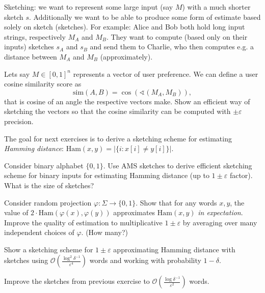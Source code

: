 \documentclass[12pt]{uebung}
\begin{document}
 


\renewcommand{\aufgname}{Exercise}

Sketching: we want to represent some large input (say $M$) with a much shorter sketch $s$. Additionally we want to be able to produce some form of estimate based solely on sketch (sketches). For example: Alice and Bob both hold long input strings, respectively $M_A$ and $M_B$. They want to compute (based only on their inputs) sketches $s_A$ and $s_B$ and send them to Charlie, who then computes e.g. a distance between $M_A$ and $M_B$ (approximately).

\begin{aufg}
Lets say $M \in [0,1]^n$ represents a vector of user preference. We can define a user cosine similarity score as
$$\textrm{sim}(A,B) = \cos( \sphericalangle(M_A,M_B)),$$
that is cosine of an angle the respective vectors make.
Show an efficient way of sketching the vectors so that the cosine similarity can be computed with $\pm \varepsilon$ precision.
\end{aufg}

\vfill

The goal for next exercises is to derive a sketching scheme for estimating \emph{Hamming distance}: $\textrm{Ham}(x,y) = | \{ i : x[i] \not= y[i] \} |$.

\begin{aufg}
Consider binary alphabet $\{0,1\}$. Use AMS sketches to derive efficient sketching scheme  for binary inputs for estimating Hamming distance (up to $1\pm\varepsilon$ factor). What is the size of sketches?
\end{aufg}

\begin{aufg}
Consider random projection $\varphi : \Sigma \to \{0,1\}$.  Show that for any words $x,y$, the value of $2 \cdot \textrm{Ham}(\varphi(x), \varphi(y))$ approximates $\textrm{Ham}(x,y)$ \emph{in expectation}. Improve the quality of estimation to multiplicative $1\pm \varepsilon$ by averaging over many independent choices of $\varphi$. (How many?)
\end{aufg}

\begin{aufg}
Show a sketching scheme for $1\pm \varepsilon$ approximating Hamming distance with sketches using $\mathcal{O}(\frac{\log^2 \delta^{-1}}{\varepsilon^4})$ words and working with probability $1-\delta$.
\end{aufg}

\begin{aufg}[2 pts]
Improve the sketches from previous exercise to $\mathcal{O}(\frac{\log \delta^{-1}}{\varepsilon^2})$ words.
\end{aufg}
\end{document}
